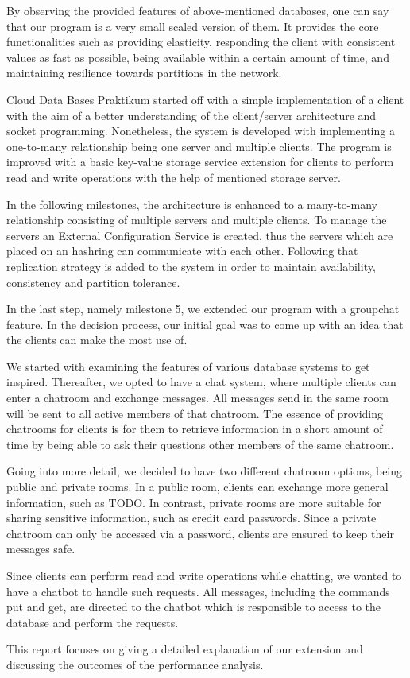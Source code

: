 By observing the provided features of above-mentioned databases, one can say that our program is a very small scaled version of them. It provides the core functionalities such as providing elasticity, responding the client with consistent values as fast as possible, being available within a certain amount of time, and maintaining resilience towards partitions in the network.

Cloud Data Bases Praktikum started off with a simple implementation of a client with the aim of a better understanding of the client/server architecture and socket programming. Nonetheless, the system is developed with implementing a one-to-many relationship being one server and multiple clients. The program is improved with a basic key-value storage service extension for clients to perform read and write operations with the help of mentioned storage server. 

In the following milestones, the architecture is enhanced to a many-to-many relationship consisting of multiple servers and multiple clients. To manage the servers an External Configuration Service is created, thus the servers which are placed on an hashring can communicate with each other. Following that replication strategy is added to the system in order to maintain availability, consistency and partition tolerance. 

In the last step, namely milestone 5, we extended our program with a groupchat feature. In the decision process, our initial goal was to come up with an idea that the clients can make the most use of.

We started with examining the features of various database systems to get inspired. Thereafter, we opted to have a chat system, where multiple clients can enter a chatroom and exchange messages. All messages send in the same room will be sent to all active members of that chatroom. The essence of providing chatrooms for clients is for them to retrieve information in a short amount of time by being able to ask their questions other members of the same chatroom. 

Going into more detail, we decided to have two different chatroom options, being public and private rooms. In a public room, clients can exchange more general information, such as TODO. In contrast, private rooms are more suitable for sharing sensitive information, such as credit card passwords. Since a private chatroom can only be accessed via a password, clients are ensured to keep their messages safe.

Since clients can perform read and write operations while chatting, we wanted to have a chatbot to handle such requests. All messages, including the commands put and get, are directed to the chatbot which is responsible to access to the database and perform the requests.
 
This report focuses on giving a detailed explanation of our extension and discussing the outcomes of the performance analysis.
